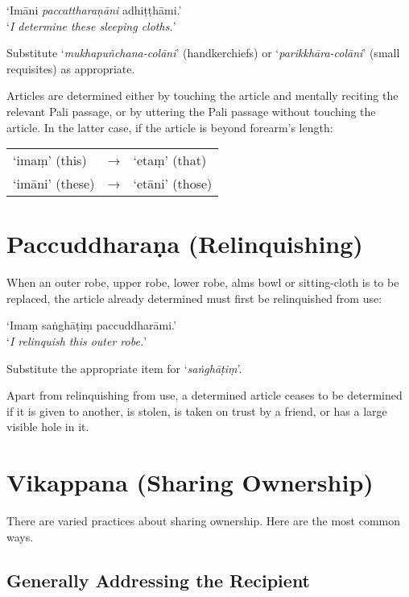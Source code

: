 ‘Imāni \emph{paccattharaṇāni} adhiṭṭhāmi.’\\
‘\emph{I determine these sleeping cloths.}’

Substitute ‘\emph{mukhapuñchana-colāni}’ (handkerchiefs) or
‘\emph{parikkhāra-colāni}’ (small requisites) as appropriate.

Articles are determined either by touching the article and mentally reciting the
relevant Pali passage, or by uttering the Pali passage without touching the
article. In the latter case, if the article is beyond forearm's length:

\ifhandbookedition
\enlargethispage{\baselineskip}
\fi

\begin{tabular}{@{}lll@{}}
‘imaṃ’ (this) & → & ‘etaṃ’ (that)\\
‘imāni’ (these) & → & ‘etāni’ (those)\\
\end{tabular}


\section{Paccuddharaṇa (Relinquishing)}
\label{relinquish-robe}

When an outer robe, upper robe, lower robe, alms bowl or sitting-cloth is to be
replaced, the article already determined must first be relinquished from use:

‘Imaṃ saṅghāṭiṃ paccuddharāmi.’\\
‘\emph{I relinquish this outer robe.}’ 

Substitute the appropriate item for ‘\emph{saṅghāṭiṃ}’.

Apart from relinquishing from use, a determined article ceases to be determined
if it is given to another, is stolen, is taken on trust by a friend, or has a
large visible hole in it.

\section{Vikappana (Sharing Ownership)}

There are varied practices about sharing ownership. Here are the most common
ways.

\subsection{Generally Addressing the Recipient}
\label{general-address}

